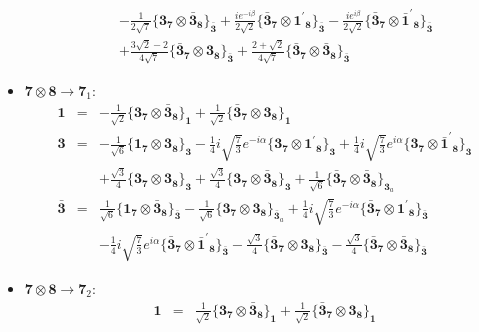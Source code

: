 \documentclass[english]{article}
\newcommand{\subcg}[3]{\big\{ {#1}\otimes{#2}\big\}^{}_{#3}}
\newcommand{\rep}[1]{\mathbf{#1}}
\begin{document}
\begin{itemize}
\begin{eqnarray*}
 & & -\frac{1}{2 \sqrt{7}}\subcg{\rep{3}_{\rep{7}}}{\rep{\bar{3}}_{\rep{8}}}{\rep{\bar{3}}}+\frac{i e^{-i \beta }}{2 \sqrt{2}}\subcg{\rep{\bar{3}}_{\rep{7}}}{\rep{1^{\prime}}_{\rep{8}}}{\rep{\bar{3}}}-\frac{i e^{i \beta }}{2 \sqrt{2}}\subcg{\rep{\bar{3}}_{\rep{7}}}{\rep{\bar{1}^{\prime}}_{\rep{8}}}{\rep{\bar{3}}} \\ 
 & & +\frac{3 \sqrt{2}-2}{4 \sqrt{7}}\subcg{\rep{\bar{3}}_{\rep{7}}}{\rep{3}_{\rep{8}}}{\rep{\bar{3}}}+\frac{2+\sqrt{2}}{4 \sqrt{7}}\subcg{\rep{\bar{3}}_{\rep{7}}}{\rep{\bar{3}}_{\rep{8}}}{\rep{\bar{3}}}
\end{eqnarray*}
\item $\rep{7}\otimes\rep{8}\to\rep{7}_{1}$:
\begin{eqnarray*}
\rep{1} &=& -\frac{1}{\sqrt{2}}\subcg{\rep{3}_{\rep{7}}}{\rep{\bar{3}}_{\rep{8}}}{\rep{1}}+\frac{1}{\sqrt{2}}\subcg{\rep{\bar{3}}_{\rep{7}}}{\rep{3}_{\rep{8}}}{\rep{1}}
\\
\rep{3} &=& -\frac{1}{\sqrt{6}}\subcg{\rep{1}_{\rep{7}}}{\rep{3}_{\rep{8}}}{\rep{3}}-\frac{1}{4} i \sqrt{\frac{7}{3}} e^{-i \alpha }\subcg{\rep{3}_{\rep{7}}}{\rep{1^{\prime}}_{\rep{8}}}{\rep{3}}+\frac{1}{4} i \sqrt{\frac{7}{3}} e^{i \alpha }\subcg{\rep{3}_{\rep{7}}}{\rep{\bar{1}^{\prime}}_{\rep{8}}}{\rep{3}} \\ 
 & & +\frac{\sqrt{3}}{4}\subcg{\rep{3}_{\rep{7}}}{\rep{3}_{\rep{8}}}{\rep{3}}+\frac{\sqrt{3}}{4}\subcg{\rep{3}_{\rep{7}}}{\rep{\bar{3}}_{\rep{8}}}{\rep{3}}+\frac{1}{\sqrt{6}}\subcg{\rep{\bar{3}}_{\rep{7}}}{\rep{\bar{3}}_{\rep{8}}}{\rep{3}_{a}}
\\
\rep{\bar{3}} &=& \frac{1}{\sqrt{6}}\subcg{\rep{1}_{\rep{7}}}{\rep{\bar{3}}_{\rep{8}}}{\rep{\bar{3}}}-\frac{1}{\sqrt{6}}\subcg{\rep{3}_{\rep{7}}}{\rep{3}_{\rep{8}}}{\rep{\bar{3}}_{a}}+\frac{1}{4} i \sqrt{\frac{7}{3}} e^{-i \alpha }\subcg{\rep{\bar{3}}_{\rep{7}}}{\rep{1^{\prime}}_{\rep{8}}}{\rep{\bar{3}}} \\ 
 & & -\frac{1}{4} i \sqrt{\frac{7}{3}} e^{i \alpha }\subcg{\rep{\bar{3}}_{\rep{7}}}{\rep{\bar{1}^{\prime}}_{\rep{8}}}{\rep{\bar{3}}}-\frac{\sqrt{3}}{4}\subcg{\rep{\bar{3}}_{\rep{7}}}{\rep{3}_{\rep{8}}}{\rep{\bar{3}}}-\frac{\sqrt{3}}{4}\subcg{\rep{\bar{3}}_{\rep{7}}}{\rep{\bar{3}}_{\rep{8}}}{\rep{\bar{3}}}
\end{eqnarray*}
\item $\rep{7}\otimes\rep{8}\to\rep{7}_{2}$:
\begin{eqnarray*}
\rep{1} &=& \frac{1}{\sqrt{2}}\subcg{\rep{3}_{\rep{7}}}{\rep{\bar{3}}_{\rep{8}}}{\rep{1}}+\frac{1}{\sqrt{2}}\subcg{\rep{\bar{3}}_{\rep{7}}}{\rep{3}_{\rep{8}}}{\rep{1}}

\end{eqnarray*}
\end{itemize}
\end{document}

